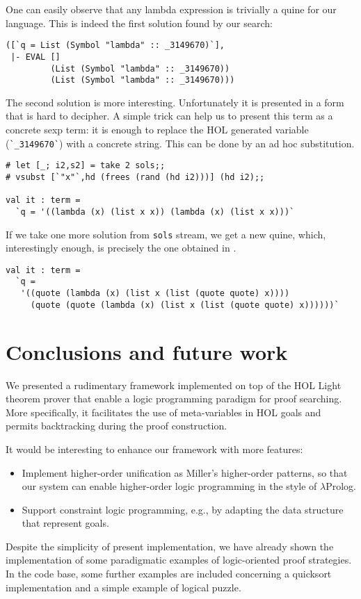 One can easily observe that any lambda expression is trivially a quine
for our language.  This is indeed the first solution found by our
search:
\begin{verbatim}
([`q = List (Symbol "lambda" :: _3149670)`],
 |- EVAL []
         (List (Symbol "lambda" :: _3149670))
         (List (Symbol "lambda" :: _3149670)))
\end{verbatim}

The second solution is more interesting.  Unfortunately it is
presented in a form that is hard to decipher.  A simple trick can help
us to present this term as a concrete sexp term: it is enough to
replace the HOL generated variable (\verb|`_3149670`|) with a concrete
string.  This can be done by an ad hoc substitution.
\begin{verbatim}
# let [_; i2,s2] = take 2 sols;;
# vsubst [`"x"`,hd (frees (rand (hd i2)))] (hd i2);;

val it : term =
  `q = '((lambda (x) (list x x)) (lambda (x) (list x x)))`
\end{verbatim}

If we take one more solution from \verb|sols| stream, we get a new
quine, which, interestingly enough, is precisely the one obtained in
\citep{Byrd:2012:MLU:2661103.2661105}.
\begin{verbatim}
val it : term =
  `q =
   '((quote (lambda (x) (list x (list (quote quote) x))))
     (quote (quote (lambda (x) (list x (list (quote quote) x))))))`
\end{verbatim}

\section{Conclusions and future work}
\label{sec:conclusions}

We presented a rudimentary framework implemented on top of the HOL
Light theorem prover that enable a logic programming paradigm for
proof searching.  More specifically, it facilitates the use of
meta-variables in HOL goals and permits backtracking during the proof
construction.

It would be interesting to enhance our framework with more features:
\begin{itemize}
\item Implement higher-order unification as Miller's higher-order
  patterns, so that our system can enable higher-order logic
  programming in the style of $\lambda$Prolog.
\item Support constraint logic programming, e.g., by adapting the data
  structure that represent goals.
\end{itemize}

Despite the simplicity of present implementation, we have already
shown the implementation of some paradigmatic examples of
logic-oriented proof strategies.  In the code base, some further
examples are included concerning a quicksort implementation and a
simple example of logical puzzle.

